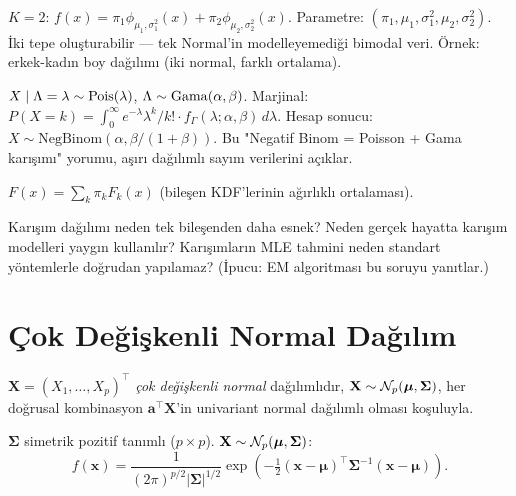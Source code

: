 \begin{ornek}
$K=2$: $f(x) = \pi_1 \phi_{\mu_1,\sigma_1^2}(x) + \pi_2 \phi_{\mu_2,\sigma_2^2}(x)$.
Parametre: $(\pi_1, \mu_1, \sigma_1^2, \mu_2, \sigma_2^2)$.
İki tepe oluşturabilir --- tek Normal'in modelleyemediği bimodal veri.
Örnek: erkek-kadın boy dağılımı (iki normal, farklı ortalama).
\end{ornek}

\begin{ornek}
$X \mid \Lambda = \lambda \sim \operatorname{Pois}(\lambda)$, $\Lambda \sim \operatorname{Gama}(\alpha, \beta)$.
Marjinal: $P(X = k) = \int_0^\infty e^{-\lambda}\lambda^k/k! \cdot f_\Gamma(\lambda;\alpha,\beta)\,d\lambda$.
Hesap sonucu: $X \sim \mathrm{NegBinom}(\alpha, \beta/(1+\beta))$.
Bu "Negatif Binom = Poisson + Gama karışımı" yorumu, aşırı dağılımlı sayım verilerini açıklar.
\end{ornek}

\begin{teorem}
$F(x) = \sum_k \pi_k F_k(x)$ (bileşen KDF'lerinin ağırlıklı ortalaması).
\end{teorem}

\begin{kritiksorgu}
Karışım dağılımı neden tek bileşenden daha esnek? Neden gerçek hayatta
karışım modelleri yaygın kullanılır? Karışımların MLE tahmini neden standart yöntemlerle
doğrudan yapılamaz? (İpucu: EM algoritması bu soruyu yanıtlar.)
\end{kritiksorgu}

\section{Çok Değişkenli Normal Dağılım}
\label{sec:cok_normal}

\begin{tanim}\label{def:cok_normal}
$\mathbf{X}=(X_1,\ldots,X_p)^\top$ \emph{çok değişkenli normal} dağılımlıdır, $\mathbf{X}\sim\mathcal{N}_p(\boldsymbol\mu,\boldsymbol\Sigma)$, her doğrusal kombinasyon $\mathbf{a}^\top\mathbf{X}$'in univariant normal dağılımlı olması koşuluyla.
\end{tanim}

\begin{teorem}\label{thm:cok_normal_yogunluk}
$\boldsymbol\Sigma$ simetrik pozitif tanımlı ($p\times p$). $\mathbf{X}\sim\mathcal{N}_p(\boldsymbol\mu,\boldsymbol\Sigma)$:
\[
  f(\mathbf{x}) = \frac{1}{(2\pi)^{p/2}|\boldsymbol\Sigma|^{1/2}}
  \exp\!\left(-\tfrac{1}{2}(\mathbf{x}-\boldsymbol\mu)^\top\boldsymbol\Sigma^{-1}(\mathbf{x}-\boldsymbol\mu)\right).
\]
\end{teorem}

